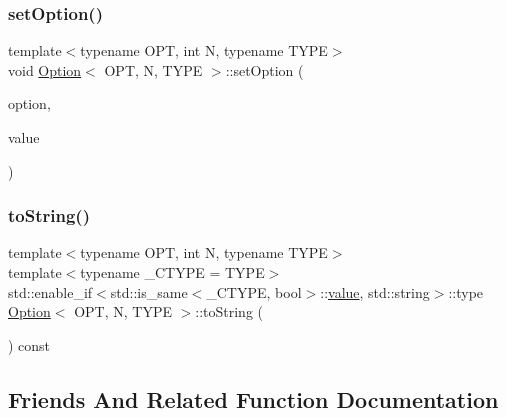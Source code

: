\mbox{\label{class_option_aa966ec4ce23f24333ea6fa4985d48730}} 
\subsubsection{\texorpdfstring{setOption()}{setOption()}\hspace{0.1cm}{\footnotesize\ttfamily [2/2]}}
{\footnotesize\ttfamily template$<$typename O\+PT, int N, typename T\+Y\+PE$>$ \\
void \mbox{\hyperlink{class_option}{Option}}$<$ O\+PT, N, T\+Y\+PE $>$\+::set\+Option (\begin{DoxyParamCaption}\item[{std\+::string}]{option,  }\item[{T\+Y\+PE}]{value }\end{DoxyParamCaption})\hspace{0.3cm}{\ttfamily [inline]}}

\mbox{\label{class_option_a506d0709a13394ec25e0a51e182604dd}} 
\subsubsection{\texorpdfstring{toString()}{toString()}}
{\footnotesize\ttfamily template$<$typename O\+PT, int N, typename T\+Y\+PE$>$ \\
template$<$typename \+\_\+\+C\+T\+Y\+PE  = T\+Y\+PE$>$ \\
std\+::enable\+\_\+if$<$std\+::is\+\_\+same$<$\+\_\+\+C\+T\+Y\+PE, bool$>$\+::\mbox{\hyperlink{diffusion_8cpp_a4b41795815d9f3d03abfc739e666d5da}{value}}, std\+::string$>$\+::type \mbox{\hyperlink{class_option}{Option}}$<$ O\+PT, N, T\+Y\+PE $>$\+::to\+String (\begin{DoxyParamCaption}{ }\end{DoxyParamCaption}) const\hspace{0.3cm}{\ttfamily [inline]}}



\subsection{Friends And Related Function Documentation}
\mbox{\label{class_option_a5c48fb7f253cafa65692cc25bac18490}} 
